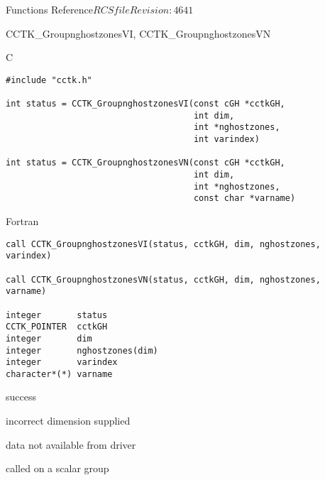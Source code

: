 \begin{cactuspart}{ Functions Reference}{$RCSfile$}{$Revision: 4641 $}
\begin{FunctionDescription}{CCTK\_GroupnghostzonesVI, CCTK\_GroupnghostzonesVN}
\begin{SynopsisSection}
\begin{Synopsis}{C}
\begin{verbatim}
#include "cctk.h"

int status = CCTK_GroupnghostzonesVI(const cGH *cctkGH,
                                     int dim,
                                     int *nghostzones,
                                     int varindex)

int status = CCTK_GroupnghostzonesVN(const cGH *cctkGH,
                                     int dim,
                                     int *nghostzones,
                                     const char *varname)
\end{verbatim}
\end{Synopsis}
\begin{Synopsis}{Fortran}
\begin{verbatim}
call CCTK_GroupnghostzonesVI(status, cctkGH, dim, nghostzones, varindex)

call CCTK_GroupnghostzonesVN(status, cctkGH, dim, nghostzones, varname)

integer       status
CCTK_POINTER  cctkGH
integer       dim
integer       nghostzones(dim)
integer       varindex
character*(*) varname
\end{verbatim}
\end{Synopsis}
\end{SynopsisSection}

\begin{ResultSection}
\begin{Result}{0} success \end{Result}
\begin{Result}{-1} incorrect dimension supplied \end{Result}
\begin{Result}{-2} data not available from driver \end{Result}
\begin{Result}{-3} called on a scalar group \end{Result}
\end{ResultSection}


\end{FunctionDescription}
\end{cactuspart}
